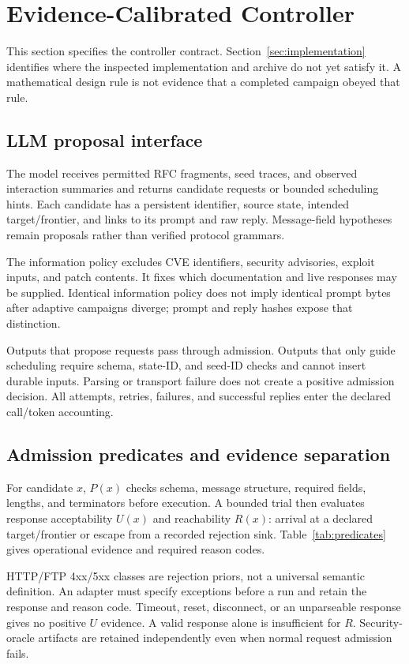 \documentclass[final,5p,times,number]{elsarticle}
\begin{document}
\section{Evidence-Calibrated Controller}
\label{sec:design}
This section specifies the controller contract. Section~\ref{sec:implementation} identifies where the inspected implementation and archive do not yet satisfy it. A mathematical design rule is not evidence that a completed campaign obeyed that rule.

\subsection{LLM proposal interface}
The model receives permitted RFC fragments, seed traces, and observed interaction summaries and returns candidate requests or bounded scheduling hints. Each candidate has a persistent identifier, source state, intended target/frontier, and links to its prompt and raw reply. Message-field hypotheses remain proposals rather than verified protocol grammars.

The information policy excludes CVE identifiers, security advisories, exploit inputs, and patch contents. It fixes which documentation and live responses may be supplied. Identical information policy does not imply identical prompt bytes after adaptive campaigns diverge; prompt and reply hashes expose that distinction.

Outputs that propose requests pass through admission. Outputs that only guide scheduling require schema, state-ID, and seed-ID checks and cannot insert durable inputs. Parsing or transport failure does not create a positive admission decision. All attempts, retries, failures, and successful replies enter the declared call/token accounting.

\subsection{Admission predicates and evidence separation}
For candidate $x$, $P(x)$ checks schema, message structure, required fields, lengths, and terminators before execution. A bounded trial then evaluates response acceptability $U(x)$ and reachability $R(x)$: arrival at a declared target/frontier or escape from a recorded rejection sink. Table~\ref{tab:predicates} gives operational evidence and required reason codes.

HTTP/FTP 4xx/5xx classes are rejection priors, not a universal semantic definition. An adapter must specify exceptions before a run and retain the response and reason code. Timeout, reset, disconnect, or an unparseable response gives no positive $U$ evidence. A valid response alone is insufficient for $R$. Security-oracle artifacts are retained independently even when normal request admission fails.
\end{document}
